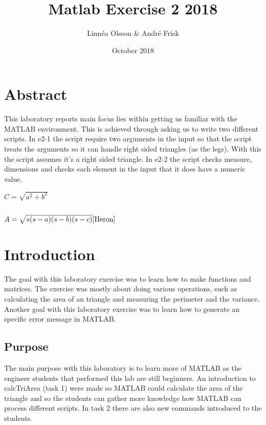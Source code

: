 \documentclass[a4paper,12pt]{article}
\title{Matlab Exercise 2 2018}
\author{Linnéa Olsson & André Frisk}
\date{October 2018}
\begin{document}
\maketitle\hrulefill\vs

\maketitle

\section{Abstract}
\begin{center}
    This laboratory reports main focus lies within getting us familiar with the MATLAB environment. This is achieved through asking us to write two different scripts. In e2-1 the script require two arguments in the input so that the script treats the arguments so it can handle right sided triangles (as the legs). With this the script assumes it's a right sided triangle. In e2-2 the script checks measure, dimensions and checks each element in the input that it does have a numeric value.  

$\displaystyle 
C=\sqrt{a^2+b^2}
$

$

$

$
A=\sqrt{s(s-a)(s-b)(s-c)}  \cite{Heron}
$

\end{center}

\section{Introduction}
The goal with this laboratory exercise was to learn how to make functions and matrices. The exercise was mostly about doing various operations, such as calculating the area of an triangle and measuring the perimeter and the variance. Another goal with this laboratory exercise was to learn how to generate an specific error message in MATLAB.

\subsection{Purpose}
The main purpose with this laboratory is to learn more of MATLAB as the engineer students that performed this lab are still beginners. An introduction to calcTriArea (task 1) were made so MATLAB could calculate the area of the triangle and so the students can gather more knowledge how MATLAB can process different scripts. In task 2 there are also new commands introduced to the students.
\end{document}

